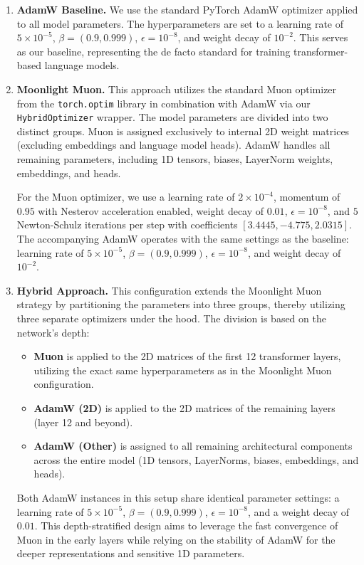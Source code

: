 \documentclass[11pt,a4paper]{article}
\begin{document}
\begin{enumerate}
	\item \textbf{AdamW Baseline.}
	      We use the standard PyTorch AdamW optimizer applied to all model
	      parameters. The hyperparameters are set to a learning
	      rate of $5 \times 10^{-5}$, $\beta = (0.9, 0.999)$, $\epsilon = 10^{-8}$,
	      and weight decay of $10^{-2}$. This serves as our baseline,
	      representing the de facto standard for training
	      transformer-based language models.

	\item \textbf{Moonlight Muon.}
	      This approach utilizes the standard Muon optimizer from the
	      \texttt{torch.optim} library in combination with AdamW
	      via our \texttt{HybridOptimizer} wrapper. The model
	      parameters are divided into two distinct groups. Muon
	      is assigned exclusively to internal 2D weight matrices
	      (excluding embeddings and language model heads). AdamW handles all
	      remaining parameters, including 1D tensors, biases, LayerNorm weights,
	      embeddings, and heads.

	      For the Muon optimizer, we use a learning rate of $2 \times 10^{-4}$,
	      momentum of $0.95$ with Nesterov acceleration enabled, weight
	      decay of $0.01$, $\epsilon = 10^{-8}$, and $5$ Newton-Schulz
	      iterations per step with coefficients $[3.4445, -4.775, 2.0315]$.
	      The accompanying AdamW operates with the same settings as the baseline:
	      learning rate of $5 \times 10^{-5}$, $\beta = (0.9, 0.999)$,
	      $\epsilon = 10^{-8}$, and weight decay of $10^{-2}$.

	\item \textbf{Hybrid Approach.}
	      This configuration extends the Moonlight Muon strategy by partitioning
	      the parameters into three groups, thereby utilizing three
	      separate optimizers under the hood. The division is based
	      on the network's depth:
	      \begin{itemize}
		      \item \textbf{Muon} is applied to the 2D matrices of the first 12
		            transformer layers, utilizing the exact same hyperparameters
		            as in the Moonlight Muon configuration.
		      \item \textbf{AdamW (2D)} is applied to the 2D matrices of the
		            remaining layers (layer 12 and beyond).
		      \item \textbf{AdamW (Other)} is assigned to all remaining
		            architectural components across the entire model (1D tensors,
		            LayerNorms, biases, embeddings, and heads).
	      \end{itemize}
	      Both AdamW instances in this setup share identical parameter settings:
	      a learning rate of $5 \times 10^{-5}$, $\beta = (0.9, 0.999)$, $\epsilon
		      = 10^{-8}$, and a weight decay of $0.01$. This depth-stratified
	      design aims to leverage the fast convergence of Muon in the early layers
	      while relying on the stability of AdamW for the deeper representations and
	      sensitive 1D parameters.
\end{enumerate}
\end{document}
